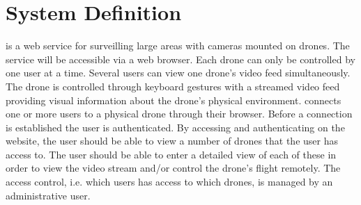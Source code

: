 \section{System Definition}
\projectname{} is a web service for surveilling large areas with cameras mounted on drones.
The service will be accessible via a web browser.
Each drone can only be controlled by one user at a time.
Several users can view one drone's video feed simultaneously.
The drone is controlled through keyboard gestures with a streamed video feed providing visual information about the drone's physical environment. 
\projectname{} connects one or more users to a physical drone through their browser.
Before a connection is established the user is authenticated.
By accessing and authenticating on the website, the user should be able to view a number of drones that the user has access to.
The user should be able to enter a detailed view of each of these in order to view the video stream and/or control the drone's flight remotely. 
The access control, i.e. which users has access to which drones, is managed by an administrative user.